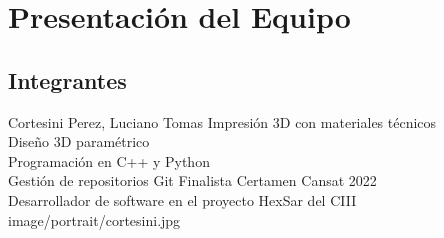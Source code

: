 \section{Presentación del Equipo}
\subsection{Integrantes}

\presentacion
  {Cortesini Perez, Luciano Tomas}
  {Impresión 3D con materiales técnicos\\Diseño 3D paramétrico\\Programación en C++ y Python\\Gestión de repositorios Git}
  {Finalista Certamen Cansat 2022\\Desarrollador de software en el proyecto HexSar del CIII}
  {image/portrait/cortesini.jpg}

